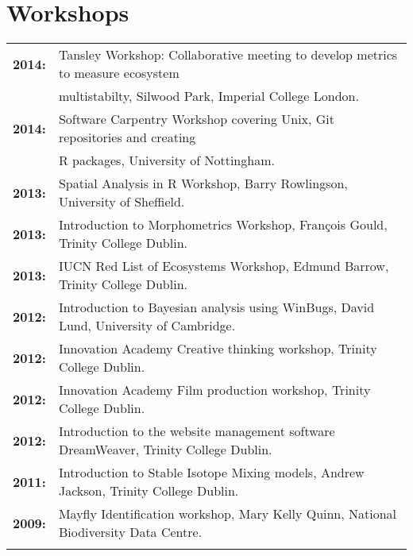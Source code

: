 \documentclass[10pt,a4paper]{article}
\begin{document}
\begin{tabular}{ll}
\end{tabular}
\bigskip

\section{Workshops}

\begin{tabular}{ll}
\textbf{2014:} & Tansley Workshop: Collaborative meeting to develop metrics to measure ecosystem\\
&multistabilty, Silwood Park, Imperial College London.\\
\textbf{2014:} & Software Carpentry Workshop covering Unix, Git repositories and creating\\
&R packages, University of Nottingham.\\
\textbf{2013:} & Spatial Analysis in R Workshop, Barry Rowlingson, University of Sheffield.\\
\textbf{2013:} & Introduction to Morphometrics Workshop, François Gould, Trinity College Dublin.\\
\textbf{2013:} & IUCN Red List of Ecosystems Workshop, Edmund Barrow, Trinity College Dublin.\\
\textbf{2012:} & Introduction to Bayesian analysis using WinBugs, David Lund, University of Cambridge.\\
\textbf{2012:} & Innovation Academy Creative thinking workshop, Trinity College Dublin.\\
\textbf{2012:} & Innovation Academy Film production workshop, Trinity College Dublin.\\
\textbf{2012:} & Introduction to the website management software DreamWeaver, Trinity College Dublin.\\
\textbf{2011:} & Introduction to Stable Isotope Mixing models, Andrew Jackson, Trinity College Dublin.\\
\textbf{2009:} & Mayfly Identification workshop, Mary Kelly Quinn, National Biodiversity Data Centre.\\
&\\
\end{tabular}
\end{document}
